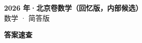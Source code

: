 \documentclass[zihao=-4, a4paper]{ctexart}
\begin{document}
\begin{center}
  {\Large\bfseries 2026 年·北京卷数学（回忆版，内部候选）}\\[4pt]
  {\large 数学 · 简答版}
\end{center}
\medskip
{}

\clearpage
{}
\begin{center}{\Large\bfseries 答案速查}\end{center}
\medskip

\end{document}
